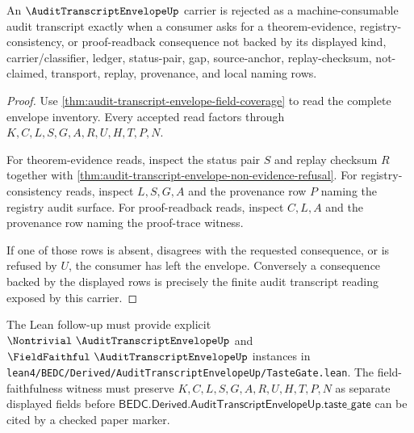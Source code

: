 \begin{theorem}
\label{thm:audit-transcript-envelope-falsifiable-prediction}
An $\AuditTranscriptEnvelopeUp$ carrier is rejected as a machine-consumable audit transcript exactly when a consumer asks for a theorem-evidence, registry-consistency, or proof-readback consequence not backed by its displayed kind, carrier/classifier, ledger, status-pair, gap, source-anchor, replay-checksum, not-claimed, transport, replay, provenance, and local naming rows.
\end{theorem}
\begin{proof}
Use \autoref{thm:audit-transcript-envelope-field-coverage} to read the complete envelope inventory. Every accepted read factors through $K,C,L,S,G,A,R,U,H,T,P,N$.

For theorem-evidence reads, inspect the status pair $S$ and replay checksum $R$ together with \autoref{thm:audit-transcript-envelope-non-evidence-refusal}. For registry-consistency reads, inspect $L,S,G,A$ and the provenance row $P$ naming the registry audit surface. For proof-readback reads, inspect $C,L,A$ and the provenance row naming the proof-trace witness.

If one of those rows is absent, disagrees with the requested consequence, or is refused by $U$, the consumer has left the envelope. Conversely a consequence backed by the displayed rows is precisely the finite audit transcript reading exposed by this carrier.
\end{proof}



The Lean follow-up must provide explicit $\Nontrivial\ \AuditTranscriptEnvelopeUp$ and $\FieldFaithful\ \AuditTranscriptEnvelopeUp$ instances in \texttt{lean4/BEDC/Derived/AuditTranscriptEnvelopeUp/TasteGate.lean}. The field-faithfulness witness must preserve $K,C,L,S,G,A,R,U,H,T,P,N$ as separate displayed fields before $\mathsf{BEDC.Derived.AuditTranscriptEnvelopeUp.taste\_gate}$ can be cited by a checked paper marker.

